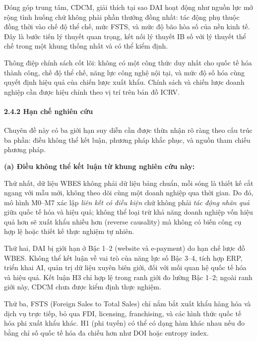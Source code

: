 \documentclass[
  a4paper,
  13pt]{extreport}
\begin{document}
Đóng góp trung tâm, CDCM, giải thích tại sao DAI hoạt động như nguồn lực
mở rộng tình huống chứ không phải phần thưởng đồng nhất: tác động phụ
thuộc đồng thời vào chế độ thể chế, mức FSTS, và mức độ bão hòa số của
nền kinh tế. Đây là bước tiến lý thuyết quan trọng, kết nối lý thuyết IB
số với lý thuyết thể chế trong một khung thống nhất và có thể kiểm định.

Thông điệp chính sách cốt lõi: không có một công thức duy nhất cho quốc
tế hóa thành công, chế độ thể chế, năng lực công nghệ nội tại, và mức độ
số hóa cùng quyết định hiệu quả của chiến lược xuất khẩu. Chính sách và
chiến lược doanh nghiệp cần được hiệu chỉnh theo vị trí trên bản đồ
ICRV.

\hypertarget{hux1ea1n-chux1ebf-nghiuxean-cux1ee9u}{%
\paragraph{2.4.2 Hạn chế nghiên
cứu}\label{hux1ea1n-chux1ebf-nghiuxean-cux1ee9u}}

Chuyên đề này có ba giới hạn suy diễn cần được thừa nhận rõ ràng theo
cấu trúc ba phần: điều không thể kết luận, phương pháp khắc phục, và
nguồn tham chiếu phương pháp.

\textbf{(a) Điều không thể kết luận từ khung nghiên cứu này:}

Thứ nhất, dữ liệu WBES không phải dữ liệu bảng chuẩn, mỗi sóng là thiết
kế cắt ngang với mẫu mới, không theo dõi cùng một doanh nghiệp qua thời
gian. Do đó, mô hình M0--M7 xác lập \emph{liên kết có điều kiện} chứ
không phải \emph{tác động nhân quả} giữa quốc tế hóa và hiệu quả; không
thể loại trừ khả năng doanh nghiệp vốn hiệu quả hơn sẽ xuất khẩu nhiều
hơn (reverse causality) mà không có biến công cụ hợp lệ hoặc thiết kế
thực nghiệm tự nhiên.

Thứ hai, DAI bị giới hạn ở Bậc 1--2 (website và e-payment) do hạn chế
lược đồ WBES. Không thể kết luận về vai trò của năng lực số Bậc 3--4,
tích hợp ERP, triển khai AI, quản trị dữ liệu xuyên biên giới, đối với
mối quan hệ quốc tế hóa và hiệu quả. Kết luận H3 chỉ hợp lệ trong ranh
giới đo lường Bậc 1--2; ngoài ranh giới này, CDCM chưa được kiểm định
thực nghiệm.

Thứ ba, FSTS (Foreign Sales to Total Sales) chỉ nắm bắt xuất khẩu hàng
hóa và dịch vụ trực tiếp, bỏ qua FDI, licensing, franchising, và các
hình thức quốc tế hóa phi xuất khẩu khác. H1 (phi tuyến) có thể có dạng
hàm khác nhau nếu đo bằng chỉ số quốc tế hóa đa chiều hơn như DOI hoặc
entropy index.
\end{document}
